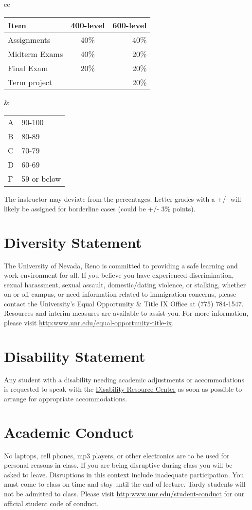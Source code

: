 \documentclass[11pt,onecolumn]{article}
\begin{document}
\begin{center}
\begin{tabular}{cc}
\begin{tabular}{l|c|r}	%
Item&400-level& 600-level\\\hline\hline
  Assignments&40\% & 40\%\\
  Midterm Exams&40\%& 20\%\\
  Final Exam&20\%& 20\%\\
  Term project &-- &20\%\\
\end{tabular}
&
\begin{tabular}{ll}
A&90-100\\
B&80-89\\
C&70-79\\
D&60-69\\
F&59 or below
\end{tabular}
\end{tabular}
\end{center}

The instructor may deviate from the percentages. Letter grades with a +/- will likely be assigned for borderline cases (could be +/- 3\% points). 

\section*{Diversity Statement}
The University of Nevada, Reno is committed to providing a safe learning and work environment for all. If you believe you have experienced discrimination, sexual harassment, sexual assault, domestic/dating violence, or stalking, whether on or off campus, or need information related to immigration concerns, please contact the University’s Equal Opportunity \& Title IX Office at (775) 784-1547. Resources and interim measures are available to assist you. For more information, please visit \url{http:www.unr.edu/equal-opportunity-title-ix}.

\section*{Disability Statement}
Any student with a disability needing academic adjustments or accommodations is requested to speak with the \href{http:www.unr.edu/drc}{Disability Resource Center} as soon as possible to arrange for appropriate accommodations.

\section*{Academic Conduct}
No laptops, cell phones, mp3 players, or other electronics are to be used for personal reasons in class. If you are being disruptive during class you will be asked to leave. Disruptions in this context include inadequate participation. You must come to class on time and stay until the end of lecture. Tardy students will not be admitted to class. Please visit \url{http:www.unr.edu/student-conduct} for our official student code of conduct.
\end{document}
